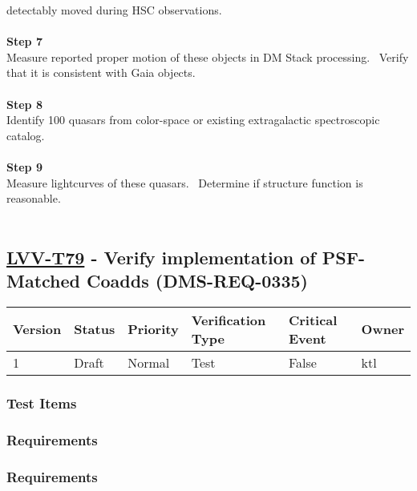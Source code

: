 detectably moved during HSC observations.\\
~\\
\textbf{Step 7}\\
Measure reported proper motion of these objects in DM Stack processing.
~Verify that it is consistent with Gaia objects.\\
~\\
\textbf{Step 8}\\
Identify 100 quasars from color-space or existing extragalactic
spectroscopic catalog.\\
~\\
\textbf{Step 9}\\
Measure lightcurves of these quasars. ~Determine if structure function
is reasonable.\\
~\\

\hypertarget{lvv-t79---verify-implementation-of-psf-matched-coadds-dms-req-0335}{%
\subsection{\texorpdfstring{\href{https://jira.lsstcorp.org/secure/Tests.jspa\#/testCase/LVV-T79}{LVV-T79}
- Verify implementation of PSF-Matched Coadds
(DMS-REQ-0335)}{LVV-T79 - Verify implementation of PSF-Matched Coadds (DMS-REQ-0335)}}\label{lvv-t79---verify-implementation-of-psf-matched-coadds-dms-req-0335}}

\begin{longtable}[]{@{}llllll@{}}
\toprule
Version & Status & Priority & Verification Type & Critical Event &
Owner\tabularnewline
\midrule
\endhead
1 & Draft & Normal & Test & False & ktl\tabularnewline
\bottomrule
\end{longtable}

\hypertarget{test-items-13}{%
\subsubsection{Test Items}\label{test-items-13}}

\hypertarget{requirements-26}{%
\subsubsection{Requirements}\label{requirements-26}}

\hypertarget{requirements-27}{%
\subsubsection{Requirements}\label{requirements-27}}

